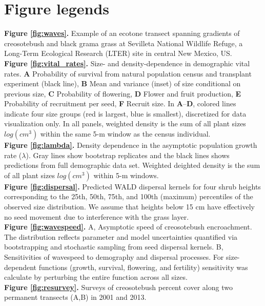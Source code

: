 \documentclass[11pt]{article}\usepackage[]{graphicx}\usepackage[usenames,dvipsnames]{xcolor}
\begin{document}
\newpage
\section*{Figure legends}
\noindent{} \textbf{Figure \ref{fig:waves}.} Example of an ecotone transect spanning gradients of creosotebush and black grama grass at Sevilleta National Wildlife Refuge, a Long-Term Ecological Research (LTER) site in central New Mexico, US.
\\
\noindent{} \textbf{Figure \ref{fig:vital_rates}.} Size- and density-dependence in demographic vital rates. \textbf{A} Probability of survival from natural population census and transplant experiment (black line), \textbf{B} Mean and variance (inset) of size conditional on previous size, \textbf{C} Probability of flowering, \textbf{D} Flower and fruit production, \textbf{E} Probability of recruitment per seed, \textbf{F} Recruit size.  In \textbf{A}--\textbf{D}, colored lines indicate four size groups (red is largest, blue is smallest), discretized for data visualization only. In all panels, weighted density is the sum of all plant sizes $log(cm^3)$ within the same 5-m window as the census individual.
\\
\noindent{} \textbf{Figure \ref{fig:lambda}.} Density dependence in the asymptotic population growth rate ($\lambda$). Gray lines show bootstrap replicates and the black lines shows predictions from full demographic data set. Weighted deighted density is the sum of all plant sizes $log(cm^3)$ within 5-m windows.
\\
\noindent{} \textbf{Figure \ref{fig:dispersal}.} Predicted WALD dispersal kernels for four shrub heights corresponding to the 25th, 50th, 75th, and 100th (maximum) percentiles of the observed size distribution. We assume that heights below 15 cm have effectively no seed movement due to interference with the grass layer.
\\
\noindent{} \textbf{Figure \ref{fig:wavespeed}.} A, Asymptotic speed of creosotebush encroachment. The distribution reflects parameter and model uncertainties quantified via bootstrapping and stochastic sampling from seed dispersal kernels. B, Sensitivities of wavespeed to demography and dispersal processes. For size-dependent functions (growth, survival, flowering, and fertility) sensitivity was calculate by perturbing the entire function across all sizes.
\\
\noindent{} \textbf{Figure \ref{fig:resurvey}.} Surveys of creosotebush percent cover along two permanent transects (A,B) in 2001 and 2013.
\end{document}
